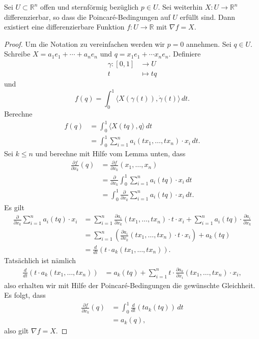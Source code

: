 \documentclass[../main.tex]{subfiles}
\begin{document}
\begin{theorem}
  Sei $U \subset \mathbb{R}^n$ offen und sternförmig bezüglich
  $p \in U$. Sei weiterhin $X \colon U \to \mathbb{R}^n$ 
  differenzierbar, so dass die Poincaré-Bedingungen
  auf $U$ erfüllt sind.
  Dann existiert eine differenzierbare Funktion
  $f \colon U \to \mathbb{R}$ mit $\nabla f = X$.
\end{theorem}

\begin{proof}
  Um die Notation zu vereinfachen werden wir $p = 0$ annehmen.
  Sei $q \in U$.
  Schreibe $X = a_1 e_1 + \cdots + a_n e_n$ und
  $q = x_1 e_1 + \cdots x_n e_n$.
  Definiere
  \begin{align*}
    \gamma \colon [0, 1] & \to U \\
    t & \mapsto tq
  \end{align*}
  und
  \[
    f(q) = \int_{0}^{1} \langle X(\gamma(t)),
    \dot \gamma (t) \rangle \, dt.
  \]
  Berechne
  \begin{align*}
    f(q)
    & = \int_{0}^{1} \langle X(tq), q \rangle \, dt\\
    &= \int_{0}^{1} \sum_{i=1}^{n} a_i(tx_1, \dots, tx_n) \cdot x_i \, dt.
  \end{align*}
  Sei $k \leq n$ und berechne mit Hilfe vom Lemma unten, dass
  \begin{align*}
    \frac{\partial f}{\partial x_k}(q)
    & = \frac{\partial f}{\partial x_k } (x_1, \dots, x_n)\\
    &= \frac{\partial}{\partial x_k} \int_{0}^{1} 
    \sum_{i=1}^{n} a_i (tq) \cdot x_i \, dt \\
    &= \int_{0}^{1} \frac{\partial}{\partial x_k}
    \sum_{i=1}^{n} a_i(tq) \cdot x_i \, dt.
  \end{align*}
  Es gilt
  \begin{align*}
    \frac{\partial}{\partial x_k}
    \sum_{i=1}^{n} a_i(tq) \cdot x_i
    &= \sum_{i=1}^{n} \frac{\partial a_i}{\partial x_k}
    (tx_1, \dots, tx_n) \cdot t \cdot x_i
    + \sum_{i=1}^{n} a_i(tq) \cdot \frac{\partial a_i}{\partial x_k}\\
    &= \sum_{i=1}^{n} \left( \frac{\partial a_i}{\partial x_k}
    (tx_1, \dots, tx_n) \cdot t \cdot x_i \right)
    + a_k(tq) \\
    &= \frac{d}{dt} (t \cdot a_k(tx_1, \dots, tx_n)).
  \end{align*}
  Tatsächlich ist nämlich
  \begin{align*}
    \frac{d}{dt}(t \cdot a_k(tx_1, \dots, tx_n))
    & = a_k(tq) + \sum_{i=1}^{n} t \cdot \frac{\partial a_k}{\partial x_i}
    (tx_1, \dots, tx_n) \cdot x_i,
  \end{align*}
  also erhalten wir mit Hilfe der Poincaré-Bedingungen
  die gewünschte Gleichheit.
  Es folgt, dass
  \begin{align*}
    \frac{\partial f}{\partial x_k}(q)
    & = \int_{0}^{1} \frac{d}{dt}(t a_k (tq)) \, dt\\
    &= a_k(q),
  \end{align*}
  also gilt $\nabla f = X$.
\end{proof}
\end{document}
